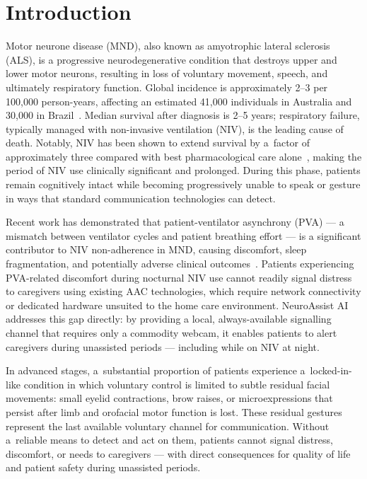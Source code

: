 
\section{Introduction}
\label{sec:introduction}

Motor neurone disease (MND), also known as amyotrophic lateral sclerosis (ALS), is a
progressive neurodegenerative condition that destroys upper and lower motor neurons,
resulting in loss of voluntary movement, speech, and ultimately respiratory function.
Global incidence is approximately 2--3 per 100{,}000 person-years, affecting an
estimated 41{,}000 individuals in Australia and 30{,}000 in Brazil~\cite{mehta2018mnd}.
Median survival after diagnosis is 2--5 years; respiratory failure, typically managed
with non-invasive ventilation (NIV), is the leading cause of death. Notably, NIV has
been shown to extend survival by a~factor of approximately three compared with best
pharmacological care alone~\cite{berlowitz2021niv}, making the period of NIV use
clinically significant and prolonged. During this phase, patients remain cognitively
intact while becoming progressively unable to speak or gesture in ways that standard
communication technologies can detect.

Recent work has demonstrated that patient-ventilator asynchrony (PVA) — a mismatch between ventilator cycles and patient breathing effort — is a significant contributor to NIV non-adherence in MND, causing discomfort, sleep fragmentation, and potentially adverse clinical outcomes~\cite{atkeson2011pva, yang2026pva, berlowitz2025tla}. Patients experiencing PVA-related discomfort during nocturnal NIV use cannot readily signal distress to caregivers using existing AAC technologies, which require network connectivity or dedicated hardware unsuited to the home care environment. NeuroAssist AI addresses this gap directly: by providing a local, always-available signalling channel that requires only a commodity webcam, it enables patients to alert caregivers during unassisted periods — including while on NIV at night.

In advanced stages, a~substantial proportion of patients experience a~locked-in-like
condition in which voluntary control is limited to subtle residual facial movements:
small eyelid contractions, brow raises, or microexpressions that persist after limb and
orofacial motor function is lost. These residual gestures represent the last available
voluntary channel for communication. Without a~reliable means to detect and act on them,
patients cannot signal distress, discomfort, or needs to caregivers — with direct
consequences for quality of life and patient safety during unassisted periods.

